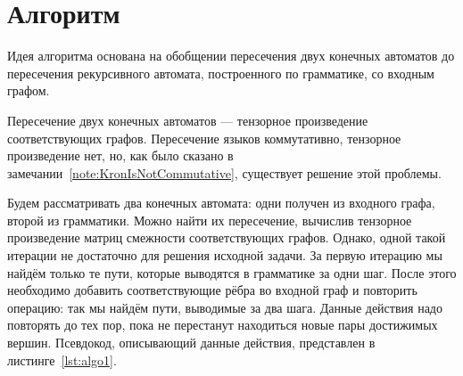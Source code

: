 \section{Алгоритм}

Идея алгоритма основана на обобщении пересечения двух конечных автоматов до пересечения рекурсивного автомата, построенного по грамматике, со входным графом.

Пересечение двух конечных автоматов --- тензорное произведение соответствующих графов.
Пересечение языков коммутативно, тензорное произведение нет, но, как было сказано в замечании~\ref{note:KronIsNotCommutative}, существует решение этой проблемы.

Будем рассматривать два конечных автомата: одни получен из входного графа, второй из грамматики.
Можно найти их пересечение, вычислив тензорное произведение матриц смежности соответствующих графов.
Однако, одной такой итерации не достаточно для решения исходной задачи. За первую итерацию мы найдём только те пути, которые выводятся в грамматике за одни шаг. После этого необходимо добавить соответствующие рёбра во входной граф и повторить операцию: так мы найдём пути, выводимые за два шага. Данные действия надо повторять до тех пор, пока не перестанут находиться новые пары достижимых вершин.
Псевдокод, описывающий данные действия, представлен в листинге~\ref{lst:algo1}.

\begin{algorithm}
\end{algorithm}


